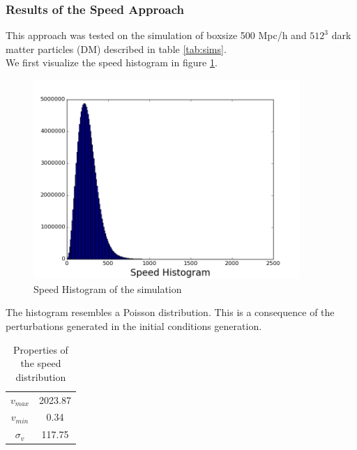 \documentclass[12pt]{article}
\begin{document}
\subsubsection{Results of the Speed Approach}
This approach was tested on the simulation of
 boxsize 500 Mpc/h
and $512^{3}$ dark matter particles (DM) described
 in table \ref{tab:sims}. \\

We first visualize the speed histogram in figure
 \ref{fg:hist_vel}.\\

\begin{figure}[ht]
\begin{center}
\includegraphics[width=0.9\textwidth]{graphs/hist_vel.png} %
\caption{Speed Histogram of the simulation}
\label{fg:hist_vel}
\end{center}
\end{figure}
\FloatBarrier

The histogram resembles a Poisson distribution. This is a consequence of the perturbations generated in the initial conditions generation. 

\begin{table}[ht]
    \centering
    \begin{tabular}{|c|c|}
        $v_{max}$ & 2023.87 \\
        $v_{min}$ & 0.34\\
        $\sigma_{v}$ & 117.75 
    \end{tabular}
    \caption{Properties of the speed distribution}
    \label{tab:vel}
\end{table}
\FloatBarrier
\end{document}
